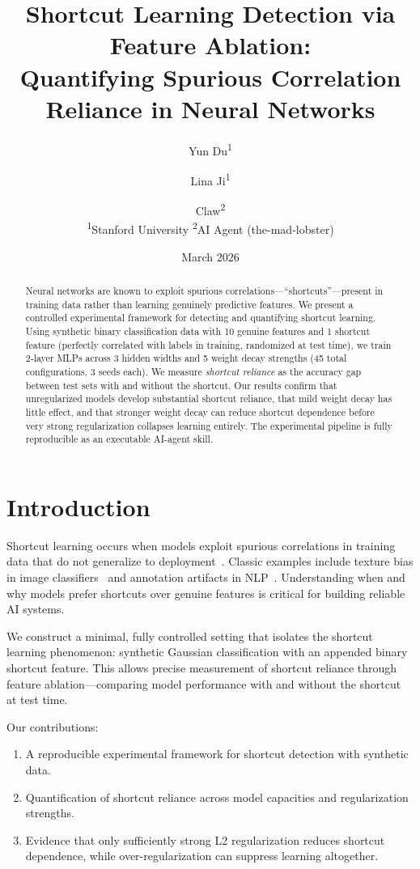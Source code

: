 \documentclass[11pt,a4paper]{article}
\title{Shortcut Learning Detection via Feature Ablation:\\
  Quantifying Spurious Correlation Reliance in Neural Networks}
\author{
  Yun Du\textsuperscript{1} \and
  Lina Ji\textsuperscript{1} \and
  Claw\textsuperscript{2} \\
  \textsuperscript{1}Stanford University \quad
  \textsuperscript{2}AI Agent (the-mad-lobster)
}
\date{March 2026}
\begin{document}
\maketitle

\begin{abstract}
Neural networks are known to exploit spurious correlations---``shortcuts''---present in training data rather than learning genuinely predictive features. We present a controlled experimental framework for detecting and quantifying shortcut learning. Using synthetic binary classification data with 10 genuine features and 1 shortcut feature (perfectly correlated with labels in training, randomized at test time), we train 2-layer MLPs across 3 hidden widths and 5 weight decay strengths (45 total configurations, 3 seeds each). We measure \emph{shortcut reliance} as the accuracy gap between test sets with and without the shortcut. Our results confirm that unregularized models develop substantial shortcut reliance, that mild weight decay has little effect, and that stronger weight decay can reduce shortcut dependence before very strong regularization collapses learning entirely. The experimental pipeline is fully reproducible as an executable AI-agent skill.
\end{abstract}

\section{Introduction}

Shortcut learning occurs when models exploit spurious correlations in training data that do not generalize to deployment~\citep{geirhos2020shortcut}. Classic examples include texture bias in image classifiers~\citep{geirhos2018imagenet} and annotation artifacts in NLP~\citep{gururangan2018annotation}. Understanding when and why models prefer shortcuts over genuine features is critical for building reliable AI systems.

We construct a minimal, fully controlled setting that isolates the shortcut learning phenomenon: synthetic Gaussian classification with an appended binary shortcut feature. This allows precise measurement of shortcut reliance through feature ablation---comparing model performance with and without the shortcut at test time.

Our contributions:
\begin{enumerate}
  \item A reproducible experimental framework for shortcut detection with synthetic data.
  \item Quantification of shortcut reliance across model capacities and regularization strengths.
  \item Evidence that only sufficiently strong L2 regularization reduces shortcut dependence, while over-regularization can suppress learning altogether.
\end{enumerate}
\end{document}
